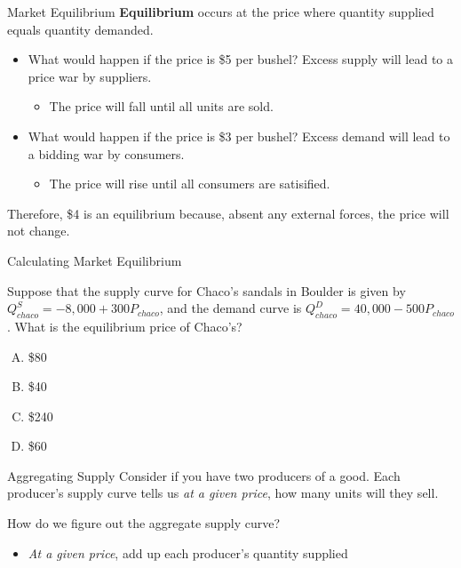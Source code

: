 \documentclass[12pt,t]{beamer}
\begin{document}
\begin{frame}{Market Equilibrium}
  \textbf{Equilibrium} occurs at the price where quantity supplied equals quantity demanded. 

  \pause
  \begin{itemize}
    \item What would happen if the price is \$5 per bushel? \pause Excess supply will lead to a price war by suppliers.
      \begin{itemize}
        \item The price will fall until all units are sold.
      \end{itemize}

    \pause 
    \item What would happen if the price is \$3 per bushel? \pause Excess demand will lead to a bidding war by consumers.
      \begin{itemize}
        \item The price will rise until all consumers are satisified.
      \end{itemize}
  \end{itemize}


  \pause 
  Therefore, \$4 is an equilibrium because, absent any external forces, the price will not change.
\end{frame}

\begin{frame}{Calculating Market Equilibrium}

\bigskip
Suppose that the supply curve for Chaco's sandals in Boulder is given by $Q^S_{chaco} = -8,000 + 300P_{chaco}$, and the demand curve is $Q^D_{chaco} = 40,000  - 500P_{chaco}$. What is the equilibrium price of Chaco's?

  \bigskip
  \begin{enumerate}[A)]
    \item \$80
    \item  \$40
    \item \$240
    \item \$60
  \end{enumerate}
\end{frame}

\begin{frame}{Aggregating Supply}
  Consider if you have two producers of a good. Each producer's supply curve tells us \emph{at a given price}, how many units will they sell.

  \bigskip
  How do we figure out the aggregate supply curve? 
  
  \pause 
  \begin{itemize}
    \item \emph{At a given price}, add up each producer's quantity supplied
  \end{itemize}
\end{frame}
\end{document}
